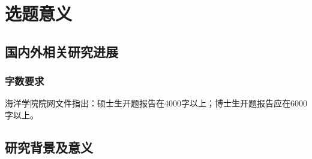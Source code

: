 \chapter{选题意义}
\section{国内外相关研究进展}
\subsection{字数要求}


海洋学院院网文件指出：硕士生开题报告在4000字以上；博士生开题报告应在6000字以上。



\section{研究背景及意义}